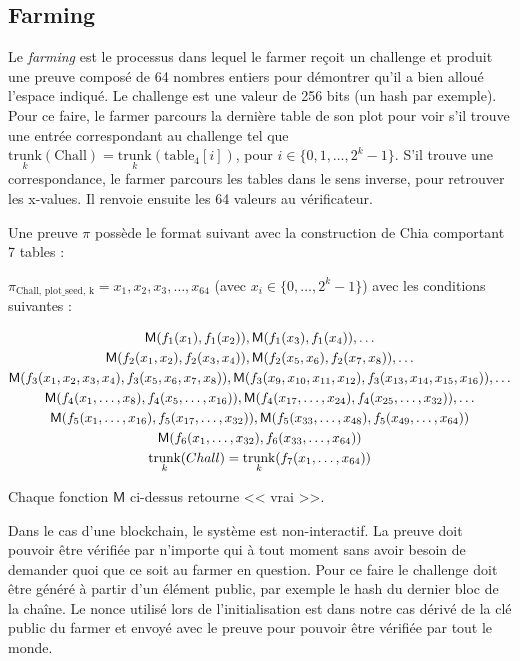 \subsection{Farming}

Le \emph{farming} est le processus dans lequel le farmer reçoit un challenge et produit une preuve composé de 64 nombres entiers pour démontrer qu'il a bien alloué l'espace indiqué. Le challenge est une valeur de 256 bits (un hash par exemple). Pour ce faire, le farmer parcours la dernière table de son plot pour voir s'il trouve une entrée correspondant au challenge tel que $\underset{k}{\mathrm{trunk}}(\mathrm{Chall})=\underset{k}{\mathrm{trunk}}(\mathrm{table_4}[i])$, pour $i \in \{0,1,\dots,2^k-1\}$. S'il trouve une correspondance, le farmer parcours les tables dans le sens inverse, pour retrouver les x-values. Il renvoie ensuite les 64 valeurs au vérificateur.

Une preuve $\pi$ possède le format suivant avec la construction de Chia \cite{chia:construction} comportant 7 tables :

$\pi_{\textrm{Chall, plot\_seed, k}}=x_1, x_2, x_3, \dots, x_{64}$ (avec $x_i \in \{0, \dots, 2^k-1\}$) avec les conditions suivantes :

\begin{gather*}
  \mathsf{M}(f_1(x_1), f_1(x_2)), \mathsf{M}(f_1(x_3), f_1(x_4)), \dots \\
  \mathsf{M}(f_2(x_1, x_2), f_2(x_3, x_4)), \mathsf{M}(f_2(x_5, x_6), f_2(x_7, x_8)), \dots \\
  \mathsf{M}(f_3(x_1, x_2, x_3, x_4), f_3(x_5, x_6, x_7, x_8)), \mathsf{M}(f_3(x_9, x_{10}, x_{11}, x_{12}), f_3(x_{13}, x_{14}, x_{15}, x_{16})), \dots \\
  \mathsf{M}(f_4(x_1, \dots, x_8), f_4(x_5, \dots, x_{16})), \mathsf{M}(f_4(x_{17}, \dots, x_{24}), f_4(x_{25}, \dots, x_{32})), \dots \\
  \mathsf{M}(f_5(x_1, \dots, x_{16}), f_5(x_{17}, \dots, x_{32})), \mathsf{M}(f_5(x_{33}, \dots, x_{48}), f_5(x_{49}, \dots, x_{64})) \\
  \mathsf{M}(f_6(x_1, \dots, x_{32}), f_6(x_{33}, \dots, x_{64})) \\
  \underset{k}{\mathrm{trunk}}(Chall)=\underset{k}{\mathrm{trunk}}(f_7(x_1, \dots, x_{64}))
\end{gather*}

Chaque fonction $\mathsf{M}$ ci-dessus retourne << vrai >>.

Dans le cas d'une blockchain, le système est non-interactif. La preuve doit pouvoir être vérifiée par n'importe qui à tout moment sans avoir besoin de demander quoi que ce soit au farmer en question. Pour ce faire le challenge doit être généré à partir d'un élément public, par exemple le hash du dernier bloc de la chaîne. Le nonce utilisé lors de l'initialisation est dans notre cas dérivé de la clé public du farmer et envoyé avec le preuve pour pouvoir être vérifiée par tout le monde.


